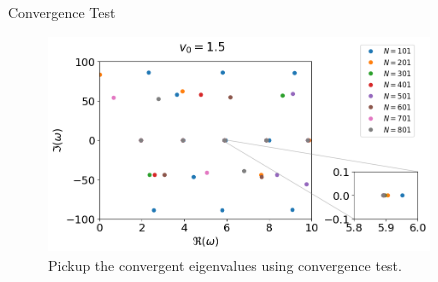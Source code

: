 \begin{frame}{Convergence Test}
  \begin{figure}
    \begin{center}
      \includegraphics[width=0.9\textwidth]{figures/convergence-test.png}
    \end{center}
    \caption{Pickup the convergent eigenvalues using convergence test.}
  \end{figure}
  
\end{frame}

